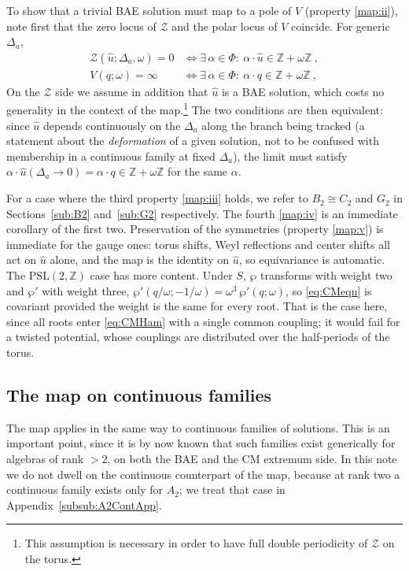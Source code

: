 \documentclass[aps, prx, nofootinbib, twocolumn,amsfonts,amsmath,amssymb,mathtools,superscriptaddress,preprintnumbers,floatfix,reprint]{revtex4-2}
\begin{document}
To show that a trivial BAE solution must map to a pole of $V$ (property
\ref{map:ii}), note first that the zero locus of $\mathcal{Z}$ and the polar
locus of $V$ coincide. For generic $\Delta_a$,
\begin{align}
  \mathcal{Z}(\hat u;\Delta_a,\omega)=0 &\iff \exists\,\alpha\in\Phi:\
    \alpha\cdot \hat u\in\mathbb{Z}+\omega\mathbb{Z}\ ,\\
  V(q;\omega)=\infty &\iff \exists\,\alpha\in\Phi:\
    \alpha\cdot q\in\mathbb{Z}+\omega\mathbb{Z}\ ,
\end{align}
On the $\mathcal{Z}$ side we assume in addition that $\hat u$ is a BAE solution, which
costs no generality in the context of the map.\footnote{This assumption is necessary in order to have full double periodicity of $\mathcal{Z}$ on the torus.} The two conditions are then
equivalent: since $\hat u$ depends continuously on the $\Delta_a$
along the branch being tracked (a statement about the \emph{deformation} of a
given solution, not to be confused with membership in a continuous family at
fixed $\Delta_a$), the limit must satisfy
$\alpha\cdot \hat u(\Delta_a\to0) = \alpha \cdot q \in\mathbb{Z}+\omega\mathbb{Z}$ for the same
$\alpha$.

For a case where the third property \ref{map:iii} holds, we refer to $B_2\cong C_2$
and $G_2$ in Sections~\ref{sub:B2} and~\ref{sub:G2} respectively. The
fourth \ref{map:iv} is an immediate corollary of the first two. Preservation of the symmetries (property \ref{map:v}) is immediate for the gauge ones: torus shifts,
Weyl reflections and center shifts all act on $\hat u$ alone, and the map is the
identity on $\hat u$, so equivariance is automatic. The
$\mathrm{PSL}(2,\mathbb{Z})$ case has more content. Under
$S$, $\wp$ transforms with weight two and $\wp'$ with weight three,
$\wp'(q/\omega;-1/\omega)=\omega^3\,\wp'(q;\omega)$, so \eqref{eq:CMeqn} is
covariant provided the weight is the same for every root. That is the case
here, since all roots enter \eqref{eq:CMHam} with a single common coupling; it
would fail for a twisted potential, whose couplings are distributed over the
half-periods of the torus.

\subsection{The map on continuous families}
\label{sub:continuous}

The map applies in the same way to continuous families of solutions.
This is an important point, since it is by now known that such families exist
generically for algebras of rank $>2$, on both the BAE and the CM extremum
side. In this note we do not dwell on the continuous counterpart of the map,
because at rank two a continuous family exists only for $A_2$; we treat that
case in Appendix~\ref{subsub:A2ContApp}.
\end{document}
